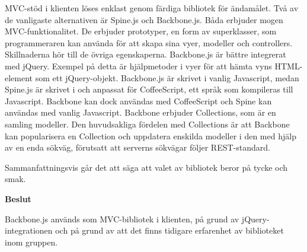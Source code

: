 MVC-stöd i klienten löses enklast genom färdiga bibliotek för ändamålet. Två av de vanligaste alternativen är Spine.js och Backbone.js.
Båda erbjuder mogen MVC-funktionalitet. De erbjuder prototyper, en form av superklasser, som programmeraren kan använda för att skapa sina vyer, modeller och controllers. Skillnaderna hör till de övriga egenskaperna. 
Backbone.js är bättre integrerat med jQuery. Exempel på detta är hjälpmetoder i vyer för att hämta vyns HTML-element som ett jQuery-objekt. Backbone.js är skrivet i vanlig Javascript, medan Spine.js är skrivet i och anpassat för CoffeeScript, ett språk som kompileras till Javascript. Backbone kan dock användas med CoffeeScript och Spine kan användas med vanlig Javascript. Backbone erbjuder Collections, som är en samling modeller. Den huvudsakliga fördelen med Collections är att Backbone kan popularisera en Collection och uppdatera enskilda modeller i den med hjälp av en enda sökväg, förutsatt att serverns sökvägar följer REST-standard.

Sammanfattningsvis går det att säga att valet av bibliotek beror på tycke och smak.

\begin{flushright}
  
  \textbf{Beslut}
  
  Backbone.js används som MVC-bibliotek i klienten, på grund av jQuery-integrationen och på grund av att det finns tidigare erfarenhet av biblioteket inom gruppen.
  
\end{flushright}